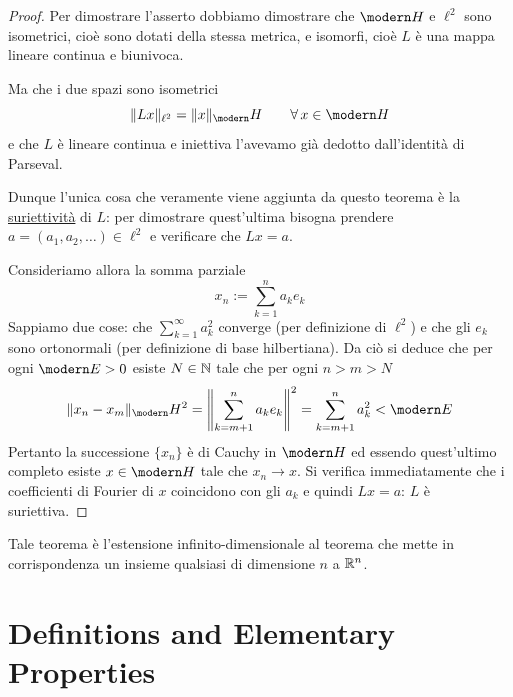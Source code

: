 \begin{proof}
Per dimostrare l'asserto dobbiamo dimostrare che $\Hc$ e $\ell^2$ sono isometrici, cioè sono dotati della stessa metrica, e isomorfi, cioè $L$ è una mappa lineare continua e biunivoca.

Ma che i due spazi sono isometrici
\begin{equation*}
\Vert Lx \Vert_{\ell^2}=\Vert x \Vert_\Hc \qquad \forall x\in \Hc
\end{equation*}
e che $L$ è lineare continua e iniettiva l'avevamo già dedotto dall'identità di Parseval.

Dunque l'unica cosa che veramente viene aggiunta da questo teorema è la \underline{suriettività} di $L$: per dimostrare quest'ultima bisogna prendere $a=(a_1,a_2,\dots)\in\ell^2$ e verificare che $Lx=a$. 

Consideriamo allora la somma parziale
$$
x_n:=\sum_{k=1}^na_ke_k
$$
Sappiamo due cose: che $\sum_{k=1}^\infty a_k^2$ converge (per definizione di $\ell^2$) e che gli $e_k$ sono ortonormali (per definizione di base hilbertiana). Da ciò si deduce che per ogni $\Ec>0$ esiste $N\in \mathbb{N}$ tale che per ogni $n>m>N$
$$
\Vert x_n-x_m\Vert_\Hc^2=\left\|\sum_{k=m+1}^n a_ke_k\right\|^2=\sum_{k=m+1}^n a_k^2<\Ec
$$
Pertanto la successione $\{x_n\}$ è di Cauchy in $\Hc$ ed essendo quest'ultimo completo esiste $x\in \Hc$ tale che $x_n\to x$. Si verifica immediatamente che i coefficienti di Fourier di $x$ coincidono con gli $a_k$ e quindi $Lx=a$: $L$ è suriettiva.
\end{proof}

\begin{rem}
Tale teorema è l'estensione infinito-dimensionale al teorema che mette in corrispondenza un insieme qualsiasi di dimensione $n$ a $\mathbb{R}^n$.
\end{rem}




\section{Definitions and Elementary Properties} %
\label{sec:definitions_and_elementary_properties}


